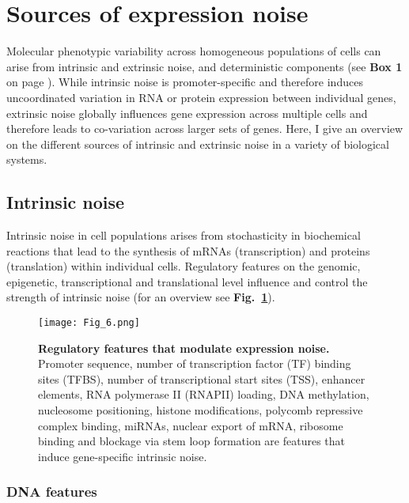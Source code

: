 
\section{Sources of expression noise} 

Molecular phenotypic variability across homogeneous populations of cells can arise from intrinsic and extrinsic noise, and deterministic components (see \textbf{Box 1} on page \pageref{box1}). 
While intrinsic noise is promoter-specific and therefore induces uncoordinated variation in RNA or protein expression between individual genes, extrinsic noise globally influences gene expression across multiple cells and therefore leads to co-variation across larger sets of genes. 
Here, I give an overview on the different sources of intrinsic and extrinsic noise in a variety of biological systems.

\subsection{Intrinsic noise}

Intrinsic noise in cell populations arises from stochasticity in biochemical reactions that lead to the synthesis of mRNAs (transcription) and proteins (translation) within individual cells. 
Regulatory features on the genomic, epigenetic, transcriptional and translational level influence and control the strength of intrinsic noise (for an overview see \textbf{Fig.~\ref{fig0:overview_intrinsic}}).

\begin{figure}[!h]
\centering
\texttt{[image: Fig\_6.png]}
\caption[Regulatory features that modulate expression noise]{\textbf{Regulatory features that modulate expression noise.}\\
Promoter sequence, number of transcription factor (TF) binding sites (TFBS), number of transcriptional start sites (TSS), enhancer elements, RNA polymerase II (RNAPII) loading, DNA methylation, nucleosome positioning, histone modifications, polycomb repressive complex binding, \glspl{miRNA}, nuclear export of mRNA, ribosome binding and blockage via stem loop formation are features that induce gene-specific intrinsic noise.}
\label{fig0:overview_intrinsic}
\end{figure}

\subsubsection{DNA features}

